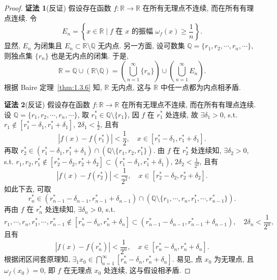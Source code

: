 \begin{proof}
\textbf{证法 1}\quad (反证) 假设存在函数 $f: \mathbb{R} \to \mathbb{R}$ 在所有无理点不连续, 而在所有有理点连续. 令
\[
E_n = \left\{x \in \mathbb{R} \mid f \text{ 在 } x \text{ 的振幅 } \omega_f(x) \geqslant \frac{1}{n}\right\}.
\]
显然, $E_n$ 为闭集且 $E_n \subset \mathbb{R} \setminus \mathbb{Q}$ 无内点. 另一方面, 设可数集 $\mathbb{Q} = \{r_1, r_2, \cdots, r_n, \cdots\}$, 则独点集 $\{r_n\}$ 也是无内点的闭集. 于是,
\[
\mathbb{R} = \mathbb{Q} \cup (\mathbb{R} \setminus \mathbb{Q}) = \left(\bigcup_{n=1}^{\infty} \{r_n\}\right) \cup \left(\bigcup_{n=1}^{\infty} E_n\right).
\]
根据 Baire 定理~\ref{thm:1.3.6} 知, $\mathbb{R}$ 无内点, 这与 $\mathbb{R}$ 中任一点都为内点相矛盾.

\textbf{证法 2}\quad (反证) 假设存在函数 $f: \mathbb{R} \to \mathbb{R}$ 在所有无理点不连续, 而在所有有理点连续. 设 $\mathbb{Q} = \{r_1, r_2, \cdots, r_n, \cdots\}$, 取 $r_1^* \in \mathbb{Q} \setminus \{r_1\}$, 因 $f$ 在 $r_1^*$ 处连续, 故 $\exists \delta_1 > 0$, s.t. $r_1 \notin [r_1^* - \delta_1, r_1^* + \delta_1]$, $2\delta_1 < \frac{1}{2}$, 且有
\[
|f(x) - f(r_1^*)| < \frac{1}{2},\quad x \in [r_1^* - \delta_1, r_1^* + \delta_1].
\]
再取 $r_2^* \in (r_1^* - \delta_1, r_1^* + \delta_1) \cap (\mathbb{Q} \setminus \{r_1, r_2, r_1^*\})$. 由 $f$ 在 $r_2^*$ 处连续知, $\exists \delta_2 > 0$, s.t. $r_1, r_2, r_1^* \notin [r_2^* - \delta_2, r_2^* + \delta_2] \subset (r_1^* - \delta_1, r_1^* + \delta_1)$, $2\delta_2 < \frac{1}{2^2}$, 且有
\[
|f(x) - f(r_2^*)| < \frac{1}{2^2},\quad x \in [r_2^* - \delta_2, r_2^* + \delta_2].
\]
如此下去, 可取
\[
r_n^* \in (r_{n-1}^* - \delta_{n-1}, r_{n-1}^* + \delta_{n-1}) \cap \left(\mathbb{Q} \setminus \{r_1, \cdots, r_n, r_1^*, \cdots, r_{n-1}^*\}\right).
\]再由 $f$ 在 $r_n^*$ 处连续知, $\exists \delta_n > 0$, s.t.
\[
r_1, \cdots, r_n, r_1^*, \cdots, r_{n-1}^* \notin [r_n^* - \delta_n, r_n^* + \delta_n] \subset (r_{n-1}^* - \delta_{n-1}, r_{n-1}^* + \delta_{n-1}),\quad 2\delta_n < \frac{1}{2^n},
\]
且有
\[
|f(x) - f(r_n^*)| < \frac{1}{2^n},\quad x \in [r_n^* - \delta_n, r_n^* + \delta_n].
\]
根据闭区间套原理知, $\exists_1 x_0 \in \bigcap\limits_{n=1}^{\infty} [r_n^* - \delta_n, r_n^* + \delta_n]$. 易见, 点 $x_0$ 为无理点, 且 $\omega_f(x_0) = 0$, 即 $f$ 在无理点 $x_0$ 处连续, 这与假设相矛盾.


\end{proof}

